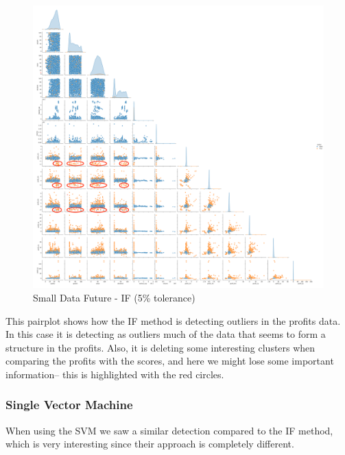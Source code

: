 \documentclass[11pt,english,a4paper,hidelinks]{book}
\begin{document}
\begin{figure}[H]
    \centering
    \includegraphics[width=1\textwidth]{images/code/outliers/Small Data future - IF.png}
    \caption{Small Data Future - IF (5\% tolerance)}
    \label{fig:small_data_future_if}
\end{figure}

\noindent This pairplot shows how the IF method is detecting outliers in the profits data. In this case it is detecting as outliers much of the data that seems to form a structure in the profits. Also, it is deleting some interesting clusters when comparing the profits with the scores, and here we might lose some important information-- this is highlighted with the red circles.

\newpage

\subsubsection{Single Vector Machine}

When using the SVM we saw a similar detection compared to the IF method, which is very interesting since their approach is completely different.
\end{document}
